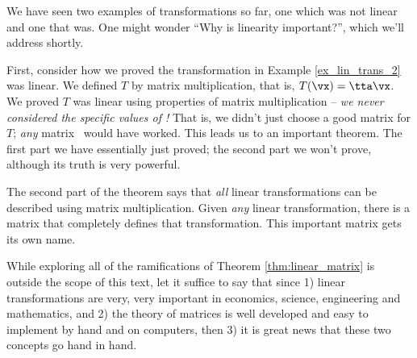 \medskip

We have seen two examples of transformations so far, one which was not linear and one that was. One might wonder ``Why is linearity important?'', which we'll address shortly.

First, consider how we proved the transformation in Example \ref{ex_lin_trans_2} was linear. We defined $T$ by matrix multiplication, that is, $T(\vx) = \tta\vx$. We proved $T$ was linear using properties of matrix multiplication -- \textit{we never considered the specific values of \tta!} That is, we didn't just choose a good matrix for $T$; \textit{any} matrix \tta\ would have worked. This leads us to an important theorem. The first part we have essentially just proved; the second part we won't prove, although its truth is very powerful.

\smallskip


\smallskip

The second part of the theorem says that \textit{all} linear transformations can be described using matrix multiplication. Given \textit{any} linear transformation, there is a matrix that completely defines that transformation. This important matrix gets its own name.



\smallskip

While exploring all of the ramifications of Theorem \ref{thm:linear_matrix} is outside the scope of this text, let it suffice to say that since 1) linear transformations are very, very important in economics, science, engineering and mathematics, and 2) the theory of matrices is well developed and easy to implement by hand and on computers, then 3) it is great news that these two concepts go hand in hand.

